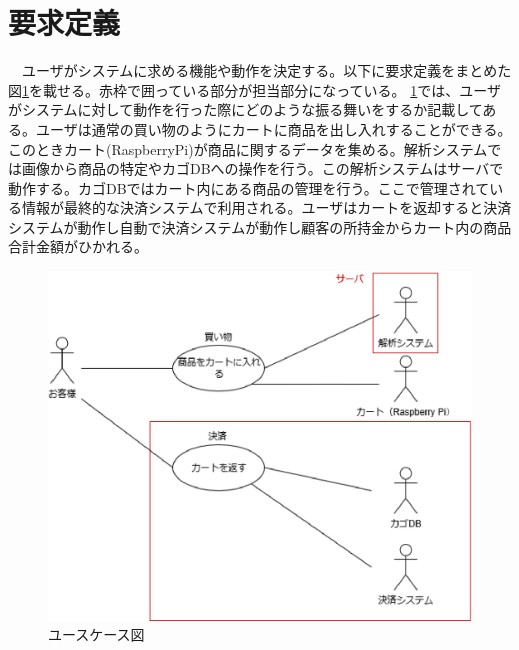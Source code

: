 \section{要求定義}
　ユーザがシステムに求める機能や動作を決定する。以下に要求定義をまとめた図\ref{usecase}を載せる。赤枠で囲っている部分が担当部分になっている。
\ref{usecase}では、ユーザがシステムに対して動作を行った際にどのような振る舞いをするか記載してある。ユーザは通常の買い物のようにカートに商品を出し入れすることができる。このときカート(RaspberryPi)が商品に関するデータを集める。解析システムでは画像から商品の特定やカゴDBへの操作を行う。この解析システムはサーバで動作する。カゴDBではカート内にある商品の管理を行う。ここで管理されている情報が最終的な決済システムで利用される。ユーザはカートを返却すると決済システムが動作し自動で決済システムが動作し顧客の所持金からカート内の商品合計金額がひかれる。

\begin{figure}[htbp]
\centering
\includegraphics[width=12cm]{./pic/usecase_saishu.eps}
\caption{ユースケース図}
\label{usecase}
\end{figure}